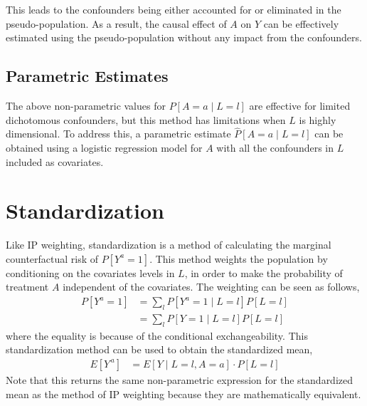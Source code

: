 This leads to the confounders being either accounted for or eliminated in the pseudo-population.  As a result, the causal effect of $A$ on $Y$ can be effectively estimated using the pseudo-population without any impact from the confounders.  

\subsection{Parametric Estimates} 
The above non-parametric values for $P[A=a\mid L=l]$ are effective for limited dichotomous confounders, but this method has limitations when $L$ is highly dimensional.  To address this, a parametric estimate $\widehat{P}[A=a\mid L=l]$ can be obtained using a logistic regression model for $A$ with all the confounders in $L$ included as covariates.  

\section{Standardization} \label{Standardization} 
Like IP weighting, standardization is a method of calculating the marginal counterfactual risk of $P[Y^a = 1]$.  This method weights the population by  conditioning on the covariates levels in $L$, in order to make the probability of treatment $A$ independent of the covariates.  The weighting can be seen as follows, 
\begin{align} 
P[Y^a = 1] &= \sum_l P[Y^a = 1 \mid L=l] P[L = l] \\ 
&= \sum_l P[Y = 1 \mid L=l] P[L = l]  
\end{align} 
where the equality is because of the conditional exchangeability.  This standardization method can be used to obtain the standardized mean, 
\begin{align} 
E[Y^{\,a}] &= E[Y \mid L = l, A =a ] \cdot P[L=l] 
\end{align} 
Note that this returns the same non-parametric expression for the standardized mean as the method of IP weighting because they are mathematically equivalent.  
